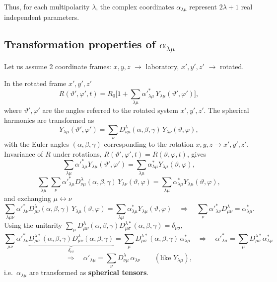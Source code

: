 \documentclass[11pt,a4paper]{article}
\begin{document}
Thus, for each multipolarity $\lambda$, the complex coordinates $\alpha_{\lambda\mu}$ represent $2\lambda+1$ real independent parameters.


\subsection{Transformation properties of \texorpdfstring{$\alpha_{\lambda\mu}$}{alpha}}
Let us assume 2 coordinate frames: $x,y,z$ $\to$ laboratory, $x',y',z'$ $\to$ rotated.
\begin{center}
\end{center}
In the rotated frame $x',y',z'$
\[
R(\vartheta',\varphi',t)=R_0\Big[1+\sum_{\lambda\mu}\alpha'^*_{\lambda\mu}\,Y_{\lambda\mu}(\vartheta',\varphi')\Big],
\]
where $\vartheta',\varphi'$ are the angles referred to the rotated system $x',y',z'$. The spherical harmonics are transformed as
\[
Y_{\lambda\mu}(\vartheta',\varphi')=\sum_\nu D^\lambda_{\nu\mu}(\alpha,\beta,\gamma)\,Y_{\lambda\nu}(\vartheta,\varphi),
\]
with the Euler angles $(\alpha,\beta,\gamma)$ corresponding to the rotation $x,y,z\to x',y',z'$.
Invariance of $R$ under rotations, $R(\vartheta',\varphi',t)=R(\vartheta,\varphi,t)$, gives
\[
\sum_{\lambda\mu}\alpha'^*_{\lambda\mu}Y_{\lambda\mu}(\vartheta',\varphi')=\sum_{\lambda\mu}\alpha^*_{\lambda\mu}Y_{\lambda\mu}(\vartheta,\varphi),
\]
\[
\sum_{\lambda\mu}\sum_\nu\alpha'^*_{\lambda\mu}D^\lambda_{\nu\mu}(\alpha,\beta,\gamma)\,Y_{\lambda\nu}(\vartheta,\varphi)=\sum_{\lambda\mu}\alpha^*_{\lambda\mu}Y_{\lambda\mu}(\vartheta,\varphi),
\]
and exchanging $\mu\leftrightarrow\nu$
\[
\sum_{\lambda\mu\nu}\alpha'^*_{\lambda\nu}D^\lambda_{\mu\nu}(\alpha,\beta,\gamma)\,Y_{\lambda\mu}(\vartheta,\varphi)=\sum_{\lambda\mu}\alpha^*_{\lambda\mu}Y_{\lambda\mu}(\vartheta,\varphi)
\quad\Rightarrow\quad
\sum_\nu\alpha'^*_{\lambda\nu}D^\lambda_{\mu\nu}=\alpha^*_{\lambda\mu}.
\]
Using the unitarity $\sum_\mu D^\lambda_{\mu\nu}(\alpha,\beta,\gamma)D^{\lambda*}_{\mu\sigma}(\alpha,\beta,\gamma)=\delta_{\nu\sigma}$,
\[
\sum_{\mu\nu}\alpha'^*_{\lambda\nu}\underbrace{D^{\lambda*}_{\mu\sigma}(\alpha,\beta,\gamma)D^\lambda_{\mu\nu}(\alpha,\beta,\gamma)}_{\delta_{\nu\sigma}}=\sum_\mu D^{\lambda*}_{\mu\sigma}(\alpha,\beta,\gamma)\,\alpha^*_{\lambda\mu}
\quad\Rightarrow\quad
\alpha'^*_{\lambda\sigma}=\sum_\mu D^{\lambda*}_{\mu\sigma}\alpha^*_{\lambda\mu}
\]
\[
\Rightarrow\quad \alpha'_{\lambda\mu}=\sum_\nu D^\lambda_{\nu\mu}\,\alpha_{\lambda\nu}
\qquad(\text{like } Y_{\lambda\mu}),
\]
i.e.\ $\alpha_{\lambda\mu}$ are transformed as \textbf{spherical tensors}.
\end{document}
